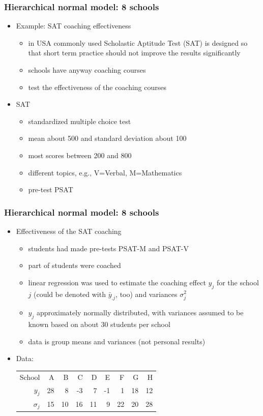 \documentclass[10pt]{beamer}
\begin{document}
\begin{frame}

\frametitle{Hierarchical normal model: 8 schools}

  \begin{itemize}
  \item Example: SAT coaching effectiveness
    \begin{itemize}
    \item in USA commonly used Scholastic Aptitude Test (SAT) is
      designed so that short term practice should not improve the
      results significantly
    \item schools have anyway coaching courses
    \item test the effectiveness of the coaching courses
    \end{itemize}
    \pause
  \item SAT
    \begin{itemize}
    \item standardized multiple choice test
    \item mean about 500 and standard deviation about 100
    \item most scores between 200 and 800
    \item different topics, e.g., V=Verbal, M=Mathematics
    \item pre-test PSAT
    \end{itemize}
\end{itemize}
\end{frame}

\begin{frame}

\frametitle{Hierarchical normal model: 8 schools}

  \begin{itemize}
  \item Effectiveness of the SAT coaching
    \begin{itemize}
    \item students had made pre-tests PSAT-M and
      PSAT-V
    \item part of students were coached
    \item linear regression was used to estimate the coaching effect
      $y_j$ for the school $j$ (could be denoted with $\bar{y}_{.j}$,
      too) and variances $\sigma_j^2$
    \item $y_j$ approximately normally distributed, with variances
      assumed to be known based on about 30 students per school
    \item data is group means and variances (not personal results)
    \end{itemize}
    \pause
  \item Data:
    {\small
    \begin{tabular}[t]{r | r r r r r r r r}
      School & A & B & C & D & E & F & G & H \\
      $y_j$ & 28 & 8 & -3 & 7 & -1 & 1 & 18 & 12 \\
      $\sigma_j$ & 15 & 10 & 16 & 11 & 9 & 22 & 20 & 28
    \end{tabular}}
  \end{itemize}
\end{frame}
\end{document}
